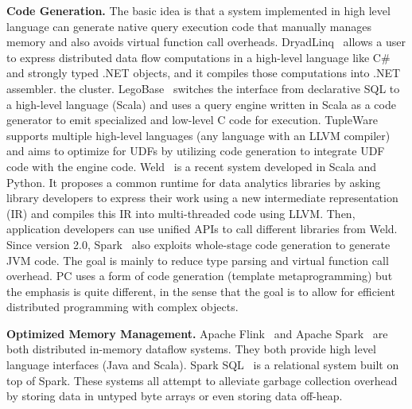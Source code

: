 \vspace{5pt}
\noindent
\textbf{Code Generation.} The basic idea is that a system implemented in high level language
can generate native query execution code that manually manages
memory and also avoids virtual function call
overheads. DryadLinq~\cite{yu2008dryadlinq} allows a user to express
distributed data flow
computations in a high-level language like C\# and strongly typed .NET
objects, and it compiles those computations into .NET assembler.
the cluster. 
LegoBase~\cite{klonatos2014building} switches the interface
from declarative SQL to a high-level language (Scala) and uses a query engine
written in Scala as a code generator to emit specialized and low-level
C code for execution. TupleWare~\cite{crotty2015tupleware} supports
multiple high-level languages (any language with an LLVM compiler) 
and aims to
optimize for UDFs by utilizing code
generation to integrate UDF code with the engine 
code. 
Weld~\cite{palkar2017weld} is a recent system developed in Scala and
Python. It proposes
a common runtime for data analytics libraries by asking library
developers to express their work using a new intermediate
representation (IR) and compiles this IR into multi-threaded code using
LLVM.  Then, application developers can use unified APIs to
call different libraries from Weld. Since version 2.0, Spark~\cite{zaharia2012resilient}
also exploits whole-stage code generation to generate JVM 
code.  The goal is mainly to reduce type parsing and virtual function call
overhead. PC uses a form of code generation (template metaprogramming) but 
the emphasis is quite different, in the sense that the goal is to allow for
efficient distributed programming with complex objects.

\vspace{5pt}
\noindent
\textbf{Optimized Memory Management.} 
Apache Flink~\cite{alexandrov2014stratosphere} and Apache
Spark~\cite{zaharia2012resilient} are both distributed in-memory
dataflow systems. They both provide high level language interfaces (Java and Scala).
Spark SQL~\cite{armbrust2015spark} is a relational system built on top
of Spark. These systems all attempt to 
alleviate garbage collection overhead by storing data
in untyped byte arrays or even storing data off-heap.


